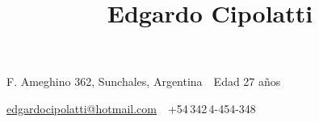 \documentclass[letterpaper,MMMyyyy,nonstop]{simpleresumecv}
\newcommand{\CVAuthor}{Edgardo Cipolatti}
\begin{document}

\title{\CVAuthor}
\vspace{.5cm}
\begin{subtitle}
F. Ameghino 362, Sunchales, Argentina\, \SubBulletSymbol\, Edad 27 años
\par
\hspace{-4cm}\href{mailto:edgardocipolatti@hotmail.com}
{edgardocipolatti@hotmail.com}
\,\SubBulletSymbol\,
+54\,342\,4-454-348
\end{subtitle}
 
\hspace{14.5cm}
\end{document}
